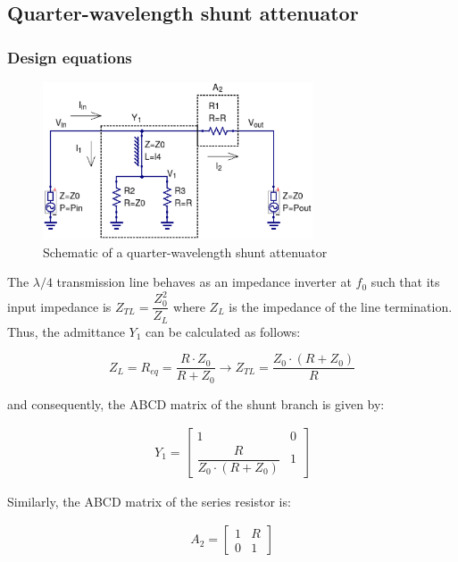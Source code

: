 \clearpage
\subsection{Quarter-wavelength shunt attenuator}


\subsubsection{Design equations}
\begin{figure}[ht]
\begin{center}
\includegraphics[width=8cm]{QW-Shunt-Attenuator-Schematic}
\end{center}
\caption{Schematic of a quarter-wavelength shunt attenuator}
\label{fig:qw-shunt-att-schematic}
\end{figure}
\FloatBarrier


\noindent The $\lambda/4$ transmission line behaves as an impedance inverter at $f_0$ such that its input impedance is $Z_{TL} = \dfrac{Z_0^2}{Z_L} $ where $Z_L$ is the impedance of the line termination. Thus, the admittance $Y_1$ can be calculated as follows:

\begin{equation}
Z_L = R_{eq} = \dfrac{R \cdot Z_0}{ R + Z_0} \rightarrow Z_{TL} = \dfrac{Z_0 \cdot (R + Z_0)}{R}
\end{equation}

\noindent and consequently, the ABCD matrix of the shunt branch is given by:

\begin{gather}
 Y_{1} = 
 \begin{bmatrix} 1 & 0 \\ \dfrac{R}{Z_0 \cdot (R + Z_0)} & 1 \end{bmatrix}
\end{gather}

\noindent Similarly, the ABCD matrix of the series resistor is:

\begin{gather}
 A_{2} = 
 \begin{bmatrix} 1 & R \\ 0 & 1 \end{bmatrix}
\end{gather}

